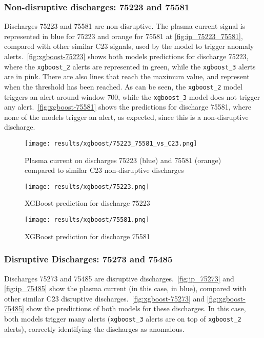 \subsubsection{Non-disruptive discharges: 75223 and 75581}

Discharges 75223 and 75581 are non-disruptive. The plasma current signal is represented in blue for 75223 and orange for 75581 at \autoref{fig:ip_75223_75581}, compared with other similar C23 signals, used by the model to trigger anomaly alerts.\ \autoref{fig:xgboost-75223} shows both models predictions for discharge 75223, where the \texttt{xgboost\_2} alerts are represented in green, while the \texttt{xgboost\_3} alerts are in pink. There are also lines that reach the maximum value, and represent when the threshold has been reached. As can be seen, the \texttt{xgboost\_2} model triggers an alert around window 700, while the \texttt{xgboost\_3} model does not trigger any alert.\ \autoref{fig:xgboost-75581} shows the predictions for discharge 75581, where none of the models trigger an alert, as expected, since this is a non-disruptive discharge.

\begin{figure}[H]
    \centering
    \texttt{[image: results/xgboost/75223\_75581\_vs\_C23.png]}
    \caption{Plasma current on discharges 75223 (blue) and 75581 (orange) compared to similar C23 non-disruptive discharges}
    \label{fig:ip_75223_75581}
\end{figure}

\begin{figure}[H]
    \centering
    \texttt{[image: results/xgboost/75223.png]}
    \caption{XGBoost prediction for discharge 75223}
    \label{fig:xgboost-75223}
\end{figure}

\begin{figure}[H]
    \centering
    \texttt{[image: results/xgboost/75581.png]}
    \caption{XGBoost prediction for discharge 75581}
    \label{fig:xgboost-75581}
\end{figure}

\subsubsection{Disruptive Discharges: 75273 and 75485}

Discharges 75273 and 75485 are disruptive discharges.\ \autoref{fig:ip_75273} and \autoref{fig:ip_75485} show the plasma current (in this case, in blue), compared with other similar C23 disruptive discharges.\ \autoref{fig:xgboost-75273} and \autoref{fig:xgboost-75485} show the predictions of both models for these discharges. In this case, both models trigger many alerts (\texttt{xgboost\_3} alerts are on top of \texttt{xgboost\_2} alerts), correctly identifying the discharges as anomalous.

